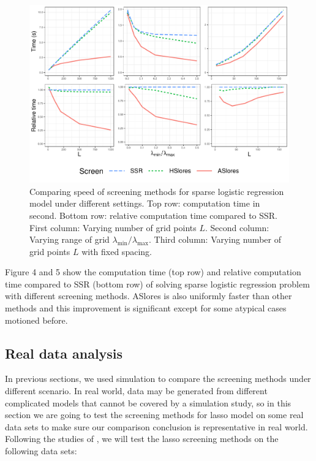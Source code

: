 \begin{figure}[h]
    \centering
    \includegraphics[scale = 0.59]{plots/512b.pdf}    \caption{Comparing speed of screening methods for sparse logistic regression model under different settings. Top row: computation time in second. Bottom row: relative computation time compared to SSR. First column: Varying number of grid points $L$. Second column: Varying range of grid $\lambda_{\min}/\lambda_{\max}$. Third column: Varying number of grid points $L$ with fixed spacing.}
    \label{fig:5.1.2b}
\end{figure}

Figure 4 and 5 show the computation time (top row) and relative computation time compared to SSR (bottom row) of solving sparse logistic regression problem with different screening methods. ASlores is also uniformly faster than other methods and this improvement is significant except for some atypical cases motioned before.


\subsection{Real data analysis}
\label{sec:real-data}

In previous sections, we used simulation to compare the screening methods under different scenario. In real world, data may be generated from different complicated models that cannot be covered by a simulation study, so in this section we are going to test the screening methods for lasso model on some real data sets to make sure our comparison conclusion is representative in real world. Following the studies of \citep{wang2013lasso, xiang2016screening, zeng2021hybrid}, we will test the lasso screening methods on the following data sets:

